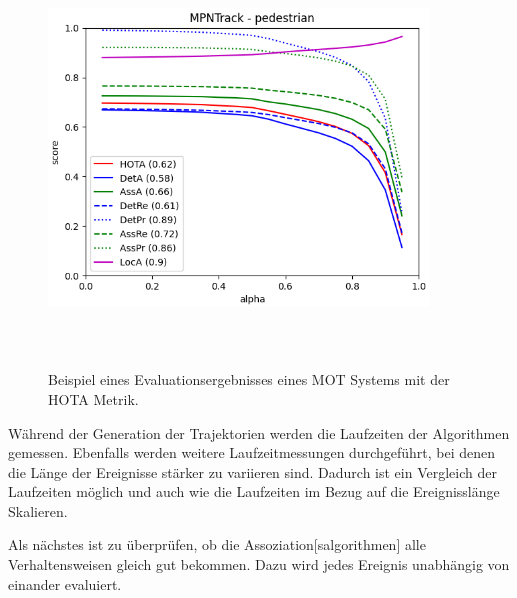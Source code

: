\begin{figure}[htb]
    \centering
    \includegraphics[width=0.9\textwidth, height=11cm]{img/Plots/MPNTrack MOT17.png}
    \caption[Beispiel eines Evaluationsergebnisses eines MOT Systems mit der HOTA Metrik.]{Beispiel eines Evaluationsergebnisses eines MOT Systems mit der HOTA Metrik.}
    \label{fig:MPNTrack}
\end{figure}

Während der Generation der Trajektorien werden die Laufzeiten der Algorithmen gemessen. Ebenfalls werden weitere Laufzeitmessungen durchgeführt, bei denen die Länge der Ereignisse stärker zu variieren sind. Dadurch ist ein Vergleich der Laufzeiten möglich und auch wie die Laufzeiten im Bezug auf die Ereignisslänge Skalieren.\par 

Als nächstes ist zu überprüfen, ob die \gls{Assoziation}[salgorithmen] alle Verhaltensweisen 
gleich gut  bekommen. Dazu wird jedes Ereignis unabhängig von einander evaluiert.\par

